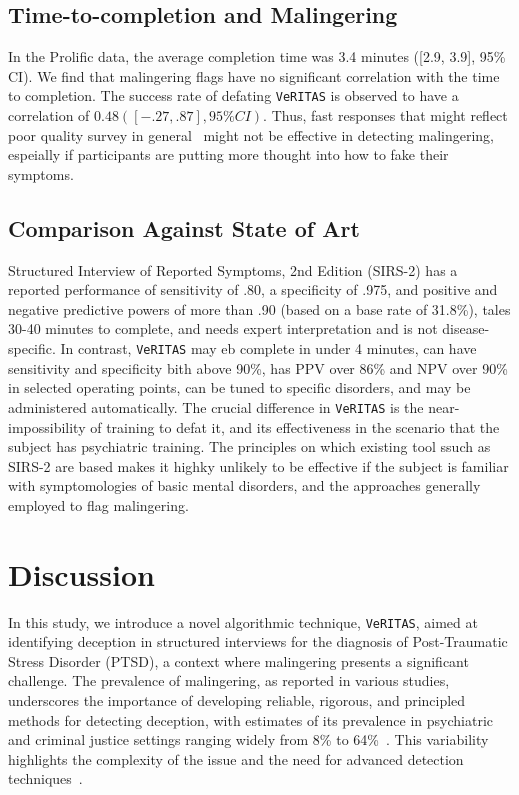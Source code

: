 \documentclass[onecolumn,10pt]{IEEEtran}
\def\vrts{\texttt{VeRITAS}\xspace}
\begin{document}
\subsection*{Time-to-completion and Malingering}
In the Prolific data, the average completion time was 3.4 minutes ([2.9, 3.9], 95\% CI). 
We find that malingering flags have no significant correlation with the time to completion. The success rate of defating \vrts is observed to have a correlation of $0.48 ([-.27, .87], 95\% CI)$. Thus, fast responses  that might reflect poor quality survey in general~\cite{tourangeau2000psychology,malhotra2008completion,callegaro2009response} might not be effective in detecting malingering, espeially if participants  are putting more thought into how to fake their symptoms.




\subsection*{Comparison Against State of Art}
Structured Interview of Reported Symptoms, 2nd Edition (SIRS-2) has a reported performance of sensitivity of .80, a specificity of .975, and positive and negative predictive powers of more than .90 (based on a base rate of 31.8\%), tales 30-40 minutes to complete, and needs expert interpretation and is not disease-specific. In contrast, \vrts may eb complete in under 4 minutes, can have sensitivity and specificity bith above 90\%, has PPV over 86\% and NPV over 90\% in selected operating points, can be tuned to specific disorders, and may be administered automatically. The crucial difference in \vrts is the near-impossibility of training to defat it, and its effectiveness in the scenario that the subject has psychiatric training. The principles on which existing tool ssuch as SIRS-2 are based makes it highky unlikely to be effective if the subject is familiar with symptomologies of basic mental disorders, and the approaches generally employed to flag malingering.


\section*{Discussion}
In this study, we introduce a novel algorithmic technique, \vrts, aimed at identifying deception in structured interviews for the diagnosis of Post-Traumatic Stress Disorder (PTSD), a context where malingering presents a significant challenge. The prevalence of malingering, as reported in various studies, underscores the importance of developing reliable, rigorous, and principled methods for detecting deception, with estimates of its prevalence in psychiatric and criminal justice settings ranging widely from 8\% to 64\%~\cite{mcdermott2013malingering,schmidt2020base,matto2019systematic}. This variability highlights the complexity of the issue and the need for advanced detection techniques~\cite{DePaulo2003}.
\end{document}
